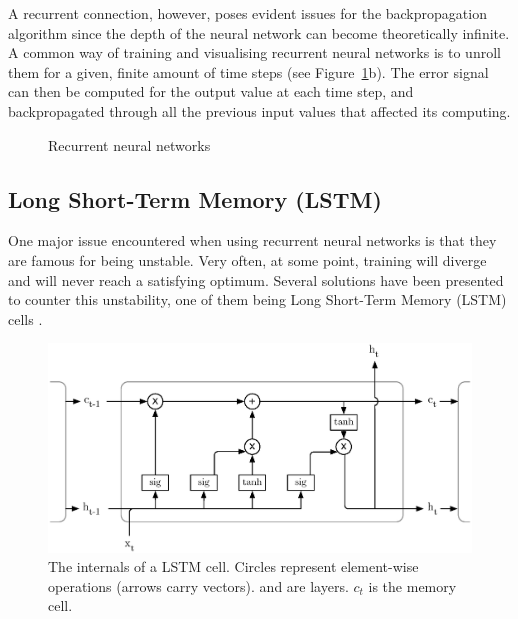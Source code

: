 A recurrent connection, however, poses evident issues for the backpropagation
algorithm since the depth of the neural network can become theoretically
infinite.  A common way of training and visualising recurrent neural networks 
is to unroll them for a given, finite amount of time steps (see 
Figure~\ref{fig:rnn}b).  The error signal can then be computed
for the output value at each time step, and backpropagated through all the
previous input values that affected its computing.\\

\begin{figure}[]
	\centering
	\qquad
	\caption{Recurrent neural networks}
	\label{fig:rnn}
\end{figure}

\subsection{Long Short-Term Memory (LSTM)}
One major issue encountered when using recurrent neural networks is that they
are famous for being unstable. Very often, at some point, training will diverge
and will never reach a satisfying optimum. Several solutions have been presented
to counter this unstability, one of them being Long Short-Term Memory (LSTM)
cells \cite{lstm}. \\

\begin{figure}
	\centering
	\includegraphics[width=0.8\linewidth]{fig/lstm.eps}
	\caption{The internals of a LSTM cell. Circles represent element-wise
	operations (arrows carry vectors).  and 
	 are layers. $c_t$ is the memory cell.}
	\label{fig:lstm}
\end{figure}

